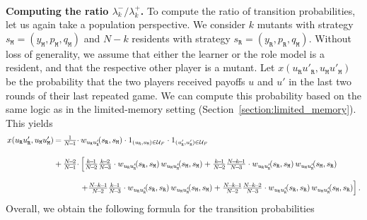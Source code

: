 \documentclass[11pt]{article}
\def\resident{\texttt{R}}
\def\mutant{\texttt{M}}
\def\strategy{s}
\theoremstyle{plainCl1}
\theoremstyle{plainCl2}
\begin{document}
 ~\\
 \noindent
 {\bf Computing the ratio $\lambda^-_k/\lambda^+_k$.}
 To compute the ratio of transition probabilities, let us again take a population perspective. 
 We consider $k$ mutants with strategy $\strategy_\mutant=(y_\mutant,p_\mutant,q_\mutant)$ and $N\!-\!k$ residents with strategy $\strategy_\resident = (y_\resident,p_\resident,q_\mutant)$. 
Without loss of generality, we assume that either the learner or the role model is a resident, and that the respective other player is a mutant. 
Let $x(u_\resident u'_\resident, u_\mutant u'_\mutant)$ be the probability that the two players received payoffs $u$ and $u'$ in the last two rounds of their last repeated game.
We can compute this probability based on the same logic as in the limited-memory setting (Section~\ref{section:limited_memory}). 
This yields
\begin{equation*}\label{eq:Chi_TwoRounds} 
\setlength{\arraycolsep}{1pt} 
\begin{array}{llll}
x(u_\resident u'_\resident, u_\mutant u'_\mutant)	 &=
&\frac{1}{N\!-\!1}\cdot  &w_{u_\resident u_\resident'}\!(\strategy_\resident,\strategy_\mutant)\cdot 1_{(u_\resident,u_\mutant)\in \mathcal{U}_F}\cdot 1_{(u'_\resident,u'_\mutant)\in \mathcal{U}_F}\\[0.5cm]
&+	
&\frac{N\!-\!2}{N\!-\!1} \cdot 
&\left[ \frac{k\!-\!1}{N\!-\!2}\frac{k\!-\!2}{N\!-\!3}\cdot w_{u_\resident u_\resident'} \!(\strategy_\resident,\strategy_\mutant) \,w_{u_\mutant u_\mutant'} \!(\strategy_\mutant,\strategy_\mutant) + 
 \frac{k\!-\!1}{N\!-\!2}\frac{N\!-\!k\!-\!1}{N\!-\!3}\cdot w_{u_\resident u_\resident'} \!(\strategy_\resident,\strategy_\mutant) \,w_{u_\mutant u_\mutant'}  \!(\strategy_\mutant,\strategy_\resident)\right.\\[0.5cm]
&&&\left. +\frac{N\!-\!k\!-\!1}{N\!-\!2}\frac{k\!-\!1}{N\!-\!3} \cdot w_{u_\resident u_\resident'} \!(\strategy_\resident,\strategy_\resident) \,w_{u_\mutant u_\mutant'} \!(\strategy_\mutant,\strategy_\mutant) + 
 \frac{N\!-\!k\!-\!1}{N\!-\!2}\frac{N\!-\!k\!-\!2}{N\!-\!3} \cdot w_{u_\resident u_\resident'} \!(\strategy_\resident,\strategy_\resident) \,w_{u_\mutant u_\mutant'}  \!(\strategy_\mutant,\strategy_\resident)\right].
\end{array}
\end{equation*}
Overall, we obtain the following formula for the transition probabilities 
\end{document}
